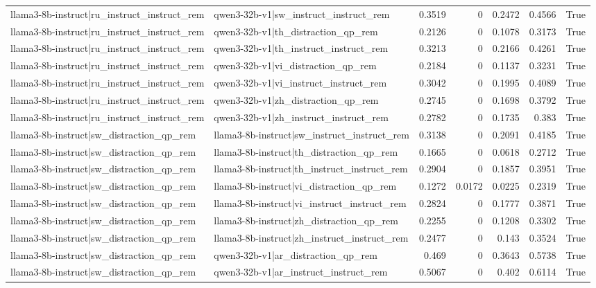 \begin{table}
\begin{tabular}{l l r r r r l}
llama3-8b-instruct|ru_instruct_instruct_rem & qwen3-32b-v1|sw_instruct_instruct_rem & 0.3519 & 0 & 0.2472 & 0.4566 & True \\
llama3-8b-instruct|ru_instruct_instruct_rem & qwen3-32b-v1|th_distraction_qp_rem & 0.2126 & 0 & 0.1078 & 0.3173 & True \\
llama3-8b-instruct|ru_instruct_instruct_rem & qwen3-32b-v1|th_instruct_instruct_rem & 0.3213 & 0 & 0.2166 & 0.4261 & True \\
llama3-8b-instruct|ru_instruct_instruct_rem & qwen3-32b-v1|vi_distraction_qp_rem & 0.2184 & 0 & 0.1137 & 0.3231 & True \\
llama3-8b-instruct|ru_instruct_instruct_rem & qwen3-32b-v1|vi_instruct_instruct_rem & 0.3042 & 0 & 0.1995 & 0.4089 & True \\
llama3-8b-instruct|ru_instruct_instruct_rem & qwen3-32b-v1|zh_distraction_qp_rem & 0.2745 & 0 & 0.1698 & 0.3792 & True \\
llama3-8b-instruct|ru_instruct_instruct_rem & qwen3-32b-v1|zh_instruct_instruct_rem & 0.2782 & 0 & 0.1735 & 0.383 & True \\
llama3-8b-instruct|sw_distraction_qp_rem & llama3-8b-instruct|sw_instruct_instruct_rem & 0.3138 & 0 & 0.2091 & 0.4185 & True \\
llama3-8b-instruct|sw_distraction_qp_rem & llama3-8b-instruct|th_distraction_qp_rem & 0.1665 & 0 & 0.0618 & 0.2712 & True \\
llama3-8b-instruct|sw_distraction_qp_rem & llama3-8b-instruct|th_instruct_instruct_rem & 0.2904 & 0 & 0.1857 & 0.3951 & True \\
llama3-8b-instruct|sw_distraction_qp_rem & llama3-8b-instruct|vi_distraction_qp_rem & 0.1272 & 0.0172 & 0.0225 & 0.2319 & True \\
llama3-8b-instruct|sw_distraction_qp_rem & llama3-8b-instruct|vi_instruct_instruct_rem & 0.2824 & 0 & 0.1777 & 0.3871 & True \\
llama3-8b-instruct|sw_distraction_qp_rem & llama3-8b-instruct|zh_distraction_qp_rem & 0.2255 & 0 & 0.1208 & 0.3302 & True \\
llama3-8b-instruct|sw_distraction_qp_rem & llama3-8b-instruct|zh_instruct_instruct_rem & 0.2477 & 0 & 0.143 & 0.3524 & True \\
llama3-8b-instruct|sw_distraction_qp_rem & qwen3-32b-v1|ar_distraction_qp_rem & 0.469 & 0 & 0.3643 & 0.5738 & True \\
llama3-8b-instruct|sw_distraction_qp_rem & qwen3-32b-v1|ar_instruct_instruct_rem & 0.5067 & 0 & 0.402 & 0.6114 & True \\

\end{tabular}
\end{table}
